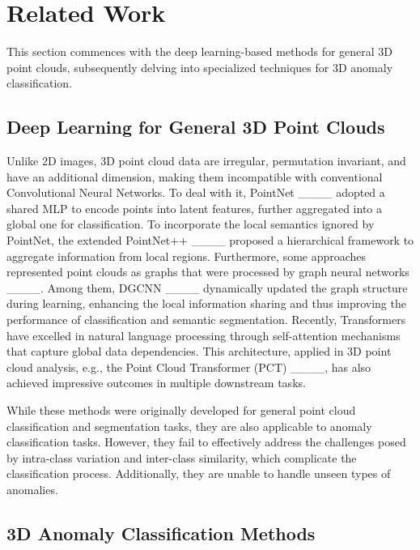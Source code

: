 \section{Related Work}
\label{related}

This section commences with the deep learning-based methods for general 3D point clouds, subsequently delving into specialized techniques for 3D anomaly classification.

\subsection{Deep Learning for General 3D Point Clouds}

Unlike 2D images, 3D point cloud data are irregular, permutation invariant, and have an additional dimension, making them incompatible with conventional Convolutional Neural Networks. To deal with it, PointNet ____ adopted a shared MLP to encode points into latent features, further aggregated into a global one for classification. To incorporate the local semantics ignored by PointNet, the extended PointNet++ ____ proposed a hierarchical framework to aggregate information from local regions. Furthermore, some approaches represented point clouds as graphs that were processed by graph neural networks ____. Among them, DGCNN ____ dynamically updated the graph structure during learning, enhancing the local information sharing and thus improving the performance of classification and semantic segmentation. Recently, Transformers have excelled in natural language processing through self-attention mechanisms that capture global data dependencies. This architecture, applied in 3D point cloud analysis, e.g., the Point Cloud Transformer (PCT) ____, has also achieved impressive outcomes in multiple downstream tasks.

While these methods were originally developed for general point cloud classification and segmentation tasks, they are also applicable to anomaly classification tasks. However, they fail to effectively address the challenges posed by intra-class variation and inter-class similarity, which complicate the classification process. Additionally, they are unable to handle unseen types of anomalies.



\subsection{3D Anomaly Classification Methods}

